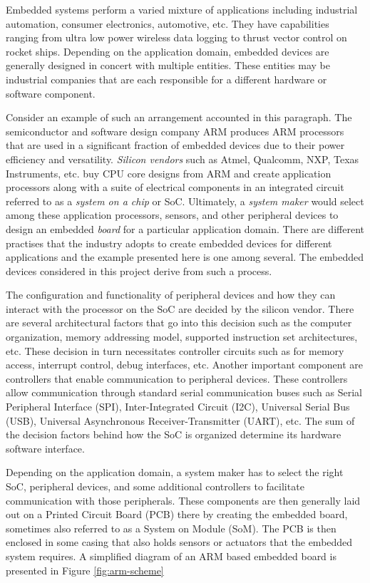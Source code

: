Embedded systems perform a varied mixture of applications including industrial automation, consumer electronics, automotive, etc. They have capabilities ranging from ultra low power wireless data logging to thrust vector control on rocket ships. Depending on the application domain, embedded devices are generally designed in concert with multiple entities. These entities may be industrial companies that are each responsible for a different hardware or software component.

Consider an example of such an arrangement accounted in this paragraph. The semiconductor and software design company ARM produces ARM processors that are used in a significant fraction of embedded devices due to their power efficiency and versatility. \textit{Silicon vendors} such as Atmel, Qualcomm, NXP, Texas Instruments, etc. buy CPU core designs from ARM and create application processors along with a suite of electrical components in an integrated circuit referred to as a \textit{system on a chip} or SoC. Ultimately, a \textit{system maker} would select among these application processors, sensors, and other peripheral devices to design an embedded \textit{board} for a particular application domain. There are different practises that the industry adopts to create embedded devices for different applications and the example presented here is one among several. The embedded devices considered in this project derive from such a process.

The configuration and functionality of peripheral devices and how they can interact with the processor on the SoC are decided by the silicon vendor. There are several architectural factors that go into this decision such as the computer organization, memory addressing model, supported instruction set architectures, etc. These decision in turn necessitates controller circuits such as for memory access, interrupt control, debug interfaces, etc. Another important component are controllers that enable communication to peripheral devices. These controllers allow communication through standard serial communication buses such as Serial Peripheral Interface (SPI), Inter-Integrated Circuit (I2C), Universal Serial Bus (USB), Universal Asynchronous Receiver-Transmitter (UART), etc. The sum of the decision factors behind how the SoC is organized determine its hardware software interface.

Depending on the application domain, a system maker has to select the right SoC, peripheral devices, and some additional controllers to facilitate communication with those peripherals. These components are then generally laid out on a Printed Circuit Board (PCB) there by creating the embedded board, sometimes also referred to as a System on Module (SoM). The PCB is then enclosed in some casing that also holds sensors or actuators that the embedded system requires. A simplified diagram of an ARM based embedded board is presented in Figure \ref{fig:arm-scheme}

